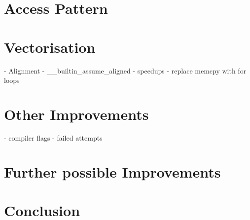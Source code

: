 \documentclass[letterpaper,twocolumn,10pt]{article}
\begin{document}
\section*{Access Pattern}

\section*{Vectorisation}
- Alignment
- \_\_builtin\_assume\_aligned
- speedups
- replace memcpy with for loops

\section*{Other Improvements}
- compiler flags
- failed attempts

\section*{Further possible Improvements}

\section*{Conclusion}




\end{document}
